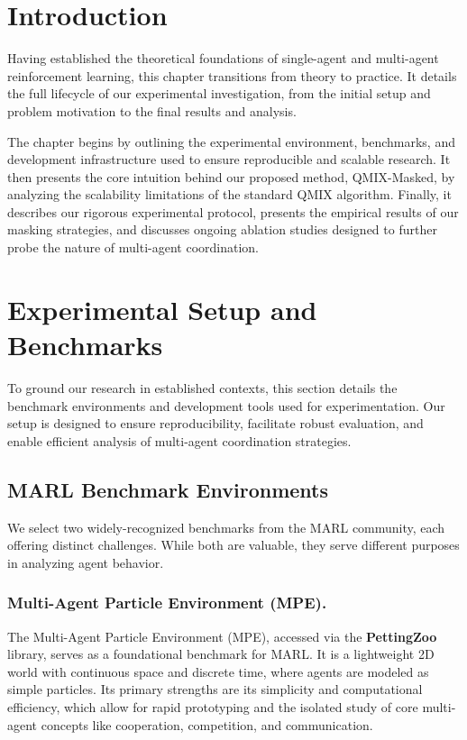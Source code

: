 \documentclass[../Main.tex]{subfiles}
\begin{document}
\section*{Introduction}

Having established the theoretical foundations of single-agent and multi-agent reinforcement learning, this chapter transitions from theory to practice. It details the full lifecycle of our experimental investigation, from the initial setup and problem motivation to the final results and analysis.

The chapter begins by outlining the experimental environment, benchmarks, and development infrastructure used to ensure reproducible and scalable research. It then presents the core intuition behind our proposed method, QMIX-Masked, by analyzing the scalability limitations of the standard QMIX algorithm. Finally, it describes our rigorous experimental protocol, presents the empirical results of our masking strategies, and discusses ongoing ablation studies designed to further probe the nature of multi-agent coordination.

\section{Experimental Setup and Benchmarks}

To ground our research in established contexts, this section details the benchmark environments and development tools used for experimentation. Our setup is designed to ensure reproducibility, facilitate robust evaluation, and enable efficient analysis of multi-agent coordination strategies.

\subsection{MARL Benchmark Environments}
We select two widely-recognized benchmarks from the MARL community, each offering distinct challenges. While both are valuable, they serve different purposes in analyzing agent behavior.

\subsubsection{Multi-Agent Particle Environment (MPE).}
The Multi-Agent Particle Environment (MPE), accessed via the \textbf{PettingZoo} library, serves as a foundational benchmark for MARL. It is a lightweight 2D world with continuous space and discrete time, where agents are modeled as simple particles. Its primary strengths are its simplicity and computational efficiency, which allow for rapid prototyping and the isolated study of core multi-agent concepts like cooperation, competition, and communication.
\end{document}
